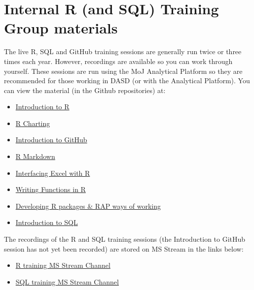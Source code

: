 \documentclass[
]{book}
\providecommand{\tightlist}{%
  \setlength{\itemsep}{0pt}\setlength{\parskip}{0pt}}
\begin{document}
\hypertarget{internal-r-and-sql-training-group-materials}{%
\section{Internal R (and SQL) Training Group materials}\label{internal-r-and-sql-training-group-materials}}

The live R, SQL and GitHub training sessions are generally run twice or three times each year. However, recordings are available so you can work through yourself. These sessions are run using the MoJ Analytical Platform so they are recommended for those working in DASD (or with the Analytical Platform). You can view the material (in the Github repositories) at:

\begin{itemize}
\tightlist
\item
  \href{https://github.com/moj-analytical-services/IntroRTraining}{Introduction to R}
\item
  \href{https://github.com/moj-analytical-services/ggplotTraining}{R Charting}
\item
  \href{https://github.com/moj-analytical-services/git-training-class}{Introduction to GitHub}
\item
  \href{https://github.com/moj-analytical-services/rmarkdown_training}{R Markdown}
\item
  \href{https://github.com/moj-analytical-services/r-excel-training}{Interfacing Excel with R}
\item
  \href{https://github.com/moj-analytical-services/writing_functions_in_r}{Writing Functions in R}
\item
  \href{https://github.com/moj-analytical-services/rpackage_training}{Developing R packages \& RAP ways of working}
\item
  \href{https://github.com/moj-analytical-services/sql_training}{Introduction to SQL}
\end{itemize}

The recordings of the R and SQL training sessions (the Introduction to GitHub session has not yet been recorded) are stored on MS Stream in the links below:

\begin{itemize}
\tightlist
\item
  \href{https://web.microsoftstream.com/channel/aa3cda5d-99d6-4e9d-ac5e-6548dd55f52a}{R training MS Stream Channel}
\item
  \href{https://web.microsoftstream.com/channel/7cd1cdaf-79cb-4e1e-ab2b-448d8f69f6a1}{SQL training MS Stream Channel}
\end{itemize}
\end{document}
